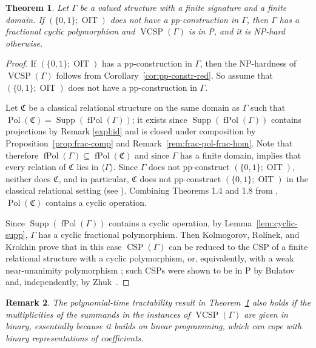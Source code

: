 \documentclass[nonacm]{acmart}
\newcommand{\bC}{{\mathfrak C}}
\DeclareMathOperator{\fPol}{fPol}
\DeclareMathOperator{\VCSP}{VCSP}
\DeclareMathOperator{\CSP}{CSP}
\DeclareMathOperator{\Pol}{Pol}
\DeclareMathOperator{\Sup}{Supp}
\DeclareMathOperator{\OIT}{OIT}
\newtheorem{theorem}{Theorem}[section]
\newtheorem{remark}[theorem]{Remark}
\begin{document}
\begin{theorem}\label{thm:fin-vcsp-tract}
Let $\Gamma$ be a valued structure with a finite signature and a finite domain. If $(\{0,1\};\OIT)$ does not have a pp-construction in $\Gamma$, then $\Gamma$ has a fractional cyclic polymorphism and $\VCSP(\Gamma)$ is in P, and it is NP-hard otherwise. 
\end{theorem}
\begin{proof}
If $(\{0,1\};\OIT)$ has a pp-construction in $\Gamma$, then the NP-hardness of $\VCSP(\Gamma)$ follows from 
Corollary~\ref{cor:pp-constr-red}.
So assume that $(\{0,1\};\OIT)$ does not have a pp-construction in $\Gamma$. 

Let $\bC$ be a classical relational structure
on the same domain as $\Gamma$ such that 
$\Pol(\bC)= \Sup(\fPol(\Gamma))$; it exists since $\Sup(\fPol(\Gamma))$ contains projections by Remark \ref{expl:id} and is closed under composition by Proposition~\ref{prop:frac-comp} and Remark~\ref{rem:frac-pol-frac-hom}. 
Note that therefore $\fPol(\Gamma) \subseteq \fPol(\bC)$ and since $\Gamma$ has a finite domain, \cite[Theorem 3.3]{FullaZivny} implies that every relation 
of $\bC$ lies in $\langle \Gamma \rangle$. Since $\Gamma$ does not pp-construct $(\{0,1\};\OIT)$, neither does $\bC$, and in particular, $\bC$ does not pp-construct $(\{0,1\};\OIT)$ in the classical relational setting (see \cite[Definition 3.4, Corollary 3.10]{wonderland}). Combining Theorems 1.4 and 1.8 from \cite{wonderland}, $\Pol(\bC)$ contains a cyclic operation. 

Since $\Sup(\fPol(\Gamma))$ contains a cyclic operation, by Lemma~\ref{lem:cyclic-supp}, 
$\Gamma$ has a cyclic fractional polymorphism.
Then 
Kolmogorov, Rol\'inek, and Krokhin \cite{KolmogorovKR17} prove that in this case $\CSP(\Gamma)$ can be reduced to the CSP of a finite relational structure with a cyclic polymorphism, or, equivalently, with a weak near-unanimity polymorphism \cite[Theorem 6.9.2]{Book}; such CSPs were shown to be in P by Bulatov~\cite{BulatovFVConjecture} and, independently, by Zhuk~\cite{ZhukFVConjecture}. 
\end{proof}

\begin{remark}\label{rem:bin-enc}
The polynomial-time tractability result in Theorem~\ref{thm:fin-vcsp-tract} also holds if the
multiplicities of the summands in the instances of $\VCSP(\Gamma)$ are given in binary, essentially because it builds on linear programming, which can cope with binary representations of coefficients.
\end{remark}
\end{document}
